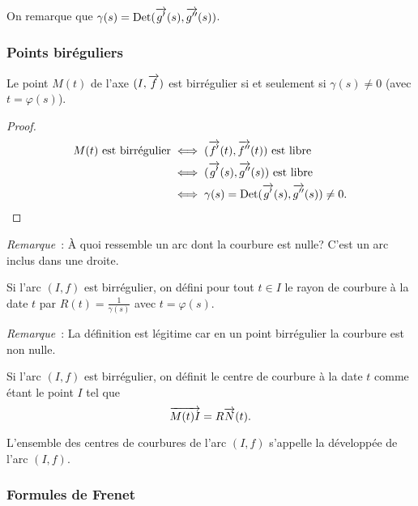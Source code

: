 On remarque que \(\gamma(s)=\operatorname{Det}(\overrightarrow{g'}(s), \overrightarrow{g''}(s))\).

\subsubsection{Points biréguliers}

\begin{prop}
  Le point \(M(t)\) de l'axe \((I, \overrightarrow{f})\) est birrégulier si et seulement
  si \(\gamma(s)\neq 0\) (avec \(t=\varphi(s)\)).
\end{prop}
\begin{proof}
  \begin{align}
    M(t) \text{~est birrégulier} &\iff (\overrightarrow{f'}(t), \overrightarrow{f''}(t)) \text{~est
    libre}\\
                                 &\iff (\overrightarrow{g'}(s), \overrightarrow{g''}(s)) \text{~est
                                 libre}\\
                                 &\iff \gamma(s)=\operatorname{Det}(\overrightarrow{g'}(s),
                                 \overrightarrow{g''}(s)) \neq 0.
    \end{align}
  \end{proof}

  \emph{Remarque}~: À quoi ressemble un arc dont la courbure est nulle? C'est un
  arc inclus dans une droite.

  \begin{defdef}
    Si l'arc \((I,f)\) est birrégulier, on défini pour tout \(t \in I\) le rayon
    de courbure à la date \(t\) par \(R(t) = \frac{1}{\gamma(s)}\) avec
    \(t=\varphi(s)\).
  \end{defdef}

  \emph{Remarque}~: La définition est légitime car en un point birrégulier la
  courbure est non nulle.

  \begin{defdef}
    Si l'arc \((I,f)\) est birrégulier, on définit le centre de courbure à la
    date \(t\) comme étant le point \(I\) tel que
    \begin{equation}
      \overrightarrow{M(t)I} = R \overrightarrow{N}(t).
    \end{equation}
  \end{defdef}
  L'ensemble des centres de courbures de l'arc \((I, f)\) s'appelle la
  développée de l'arc \((I, f)\).

  \subsubsection{Formules de Frenet}

